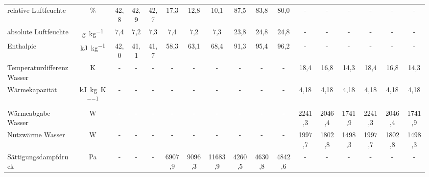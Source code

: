 \begin{landscape}
\begin{table}[h!]
{\begin{tabular}{l|c|c|c|c|c|c|c|c|c|c|c|c|c|c|c|c}
				relative Luftfeuchte & \%    & \multicolumn{1}{c|}{42,8} & \multicolumn{1}{c|}{42,9} &
				\multicolumn{1}{c|}{42,7} 
				& 17,3  & 12,8  & 10,1
				& 87,5  & 83,8  & 80,0  & -     & -     & -     & -     & -     & - \\
				absolute Luftfeuchte & \si{\gram \per \kg}  
				& \multicolumn{1}{c|}{7,4} & \multicolumn{1}{c|}{7,2} & \multicolumn{1}{c|}{7,3} 
				& 7,4   & 7,2   & 7,3
				& 23,8 & 24,8  & 24,8 & -     & -     & -     & -     & -     & - \\
				Enthalpie & \si{\kilo \joule \per \kg} & \multicolumn{1}{c|}{42,0} & \multicolumn{1}{c|}{41,1} & \multicolumn{1}{c|}{41,7} 
				& 58,3  & 63,1 & 68,4
				& 91,3  & 95,4 & 96,2 & -     & -     & -     & -     & -     & - \\
				\hline
				Temperaturdifferenz  Wasser & K     & -     & -     & -     & \multicolumn{1}{c|}{-} & \multicolumn{1}{c|}{-} & \multicolumn{1}{c|}{-} & \multicolumn{1}{c|}{-} & \multicolumn{1}{c|}{-} & \multicolumn{1}{c|}{-} 
				& \multicolumn{1}{c|}{18,4} & \multicolumn{1}{c|}{16,8} & \multicolumn{1}{c|}{14,3}
				& \multicolumn{1}{c|}{18,4} & 16,8   & 14,3\\
				Wärmekapazität & \si{\kilo \joule \per \kg \per \kelvin} & -     & -     & -     & \multicolumn{1}{c|}{-} & \multicolumn{1}{c|}{-} & \multicolumn{1}{c|}{-} & \multicolumn{1}{c|}{-} & \multicolumn{1}{c|}{-} & \multicolumn{1}{c|}{-}
				& \multicolumn{1}{c|}{4,18} & \multicolumn{1}{c|}{4,18} & \multicolumn{1}{c|}{4,18} & \multicolumn{1}{c|}{4,18} & 4,18  & 4,18 \\
				Wärmeabgabe Wasser & W     & -     & -     & -     & \multicolumn{1}{c|}{-} & \multicolumn{1}{c|}{-} & \multicolumn{1}{c|}{-} & \multicolumn{1}{c|}{-} & \multicolumn{1}{c|}{-} & \multicolumn{1}{c|}{-} & \multicolumn{1}{c|}{2241,3} & \multicolumn{1}{c|}{2046,4} & \multicolumn{1}{c|}{1741,9} & \multicolumn{1}{c|}{2241,3} & 2046,4 & 1741,9 \\
				Nutzwärme Wasser & W     & -     & -     & -     & \multicolumn{1}{c|}{-} & \multicolumn{1}{c|}{-} & \multicolumn{1}{c|}{-} & \multicolumn{1}{c|}{-} & \multicolumn{1}{c|}{-} & \multicolumn{1}{c|}{-} & \multicolumn{1}{c|}{1997,7} & \multicolumn{1}{c|}{1802,8} & \multicolumn{1}{c|}{1498,3} & \multicolumn{1}{c|}{1997,7} & 1802,8 & 1498,3 \\
				\hline
				Sättigungsdampfdruck & Pa    & -     & -     & -     & 6907,9 & 9096,3 & 11683,9 & 4260,5 & 4630,8 & 4842,6 & -     & -     & -     & -     & -     & - \\

\end{tabular}}
\end{table}
\end{landscape}
